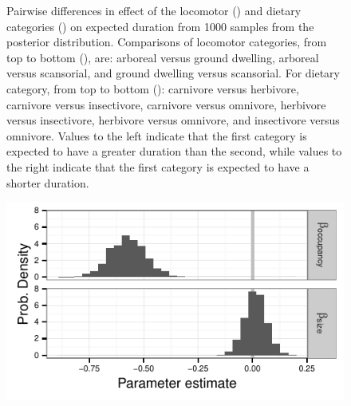\documentclass[12pt,letterpaper]{article}
\begin{document}
\begin{figure}[ht]
  \caption{Pairwise differences in effect of the locomotor () and dietary categories () on expected duration from 1000 samples from the posterior distribution. Comparisons of locomotor categories, from top to bottom (), are: arboreal versus ground dwelling, arboreal versus scansorial, and ground dwelling versus scansorial. For dietary category, from top to bottom (): carnivore versus herbivore, carnivore versus insectivore, carnivore versus omnivore, herbivore versus insectivore, herbivore versus omnivore, and insectivore versus omnivore. Values to the left indicate that the first category is expected to have a greater duration than the second, while values to the right indicate that the first category is expected to have a shorter duration.}
  \label{fig:trait_est}
\end{figure}

\begin{figure}[ht]
  \centering
  \includegraphics[height = 0.5\textheight, width = \textwidth, keepaspectratio = true]{figure/other_est}
  \caption{}
  \label{fig:eff_other}
\end{figure}
\end{document}
